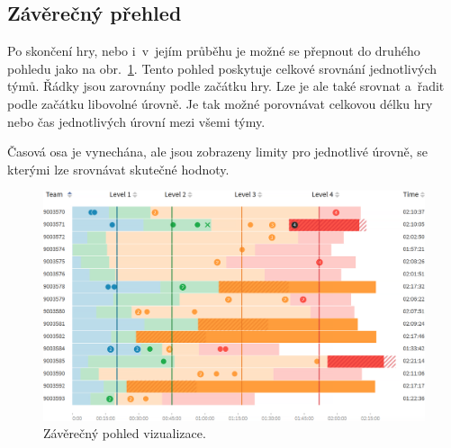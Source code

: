 \documentclass[
  digital, %
  oneside, %
  table,   %
  nolof,     %
  nolot,     %
  nocover
]{fithesis3}
\begin{document}
\subsection{Závěrečný přehled}
Po skončení hry, nebo i~v~jejím průběhu je možné se přepnout do druhého pohledu jako na obr.~\ref{fig:visualizationChartFinal}. Tento pohled poskytuje celkové srovnání jednotlivých týmů. Řádky jsou zarovnány podle začátku hry. Lze je ale také srovnat a~řadit podle začátku libovolné úrovně. Je tak možné porovnávat celkovou délku hry nebo čas jednotlivých úrovní mezi všemi týmy.\par
Časová osa je vynechána, ale jsou zobrazeny limity pro jednotlivé úrovně, se kterými lze srovnávat skutečné hodnoty.
\begin{figure}[H]
  \begin{center}
    \includegraphics[width=12.7cm]{images/vizualizace-final.png}
  \end{center}
  \caption{Závěrečný pohled vizualizace.}
  \label{fig:visualizationChartFinal}
\end{figure}
\end{document}
